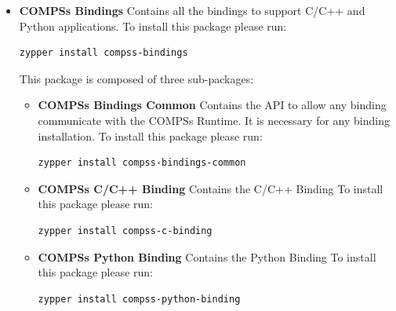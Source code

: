 \begin{itemize}
 \item \textbf{COMPSs Bindings} \newline
       Contains all the bindings to support C/C++ and Python applications. 
       \newline
       To install this package please run:
       \begin{lstlisting}[language=bash]
	  zypper install compss-bindings
       \end{lstlisting}
       This package is composed of three sub-packages:
       \begin{itemize}
        \item \textbf{COMPSs Bindings Common} \newline
	      Contains the API to allow any binding communicate with the COMPSs Runtime. It is necessary for any binding installation.
	      \newline
	      To install this package please run:
	      \begin{lstlisting}[language=bash]
		  zypper install compss-bindings-common
	      \end{lstlisting}
        \item \textbf{COMPSs C/C++ Binding} \newline
	      Contains the C/C++ Binding
	      \newline
	      To install this package please run:
	      \begin{lstlisting}[language=bash]
		  zypper install compss-c-binding
	      \end{lstlisting}
        \item \textbf{COMPSs Python Binding} \newline
	      Contains the Python Binding
	      \newline
	      To install this package please run:
	      \begin{lstlisting}[language=bash]
		  zypper install compss-python-binding
	      \end{lstlisting}
       \end{itemize}


\end{itemize}
